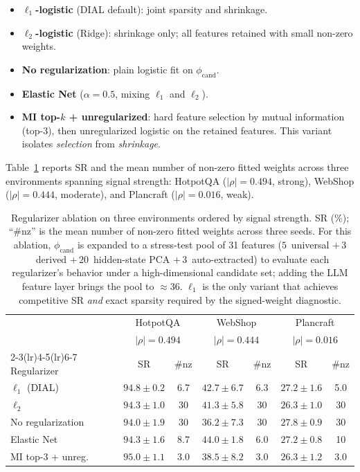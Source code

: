 \begin{itemize}
\item \textbf{$\ell_1$-logistic} (DIAL default): joint sparsity and
shrinkage.
\item \textbf{$\ell_2$-logistic} (Ridge): shrinkage only; all
features retained with small non-zero weights.
\item \textbf{No regularization}: plain logistic fit on
$\phi_{\text{cand}}$.
\item \textbf{Elastic Net} ($\alpha{=}0.5$, mixing $\ell_1$ and
$\ell_2$).
\item \textbf{MI top-$k$ + unregularized}: hard feature selection
by mutual information (top-3), then unregularized logistic on the
retained features. This variant isolates \emph{selection} from
\emph{shrinkage}.
\end{itemize}

Table~\ref{tab:regularizer-ablation} reports SR and the mean number
of non-zero fitted weights across three environments spanning
signal strength: HotpotQA ($|\rho|{=}0.494$, strong),
WebShop ($|\rho|{=}0.444$, moderate), and Plancraft
($|\rho|{=}0.016$, weak).

\begin{table}[h]
\caption{Regularizer ablation on three environments ordered by
signal strength. SR (\%); ``\#nz'' is the mean number of non-zero
fitted weights across three seeds. For this ablation, $\phi_{\text{cand}}$ is expanded to a
stress-test pool of 31 features ($5$~universal $+\,3$~derived
$+\,20$~hidden-state PCA $+\,3$~auto-extracted) to evaluate each
regularizer's behavior under a high-dimensional candidate set;
adding the LLM feature layer brings the pool to $\approx$36.
$\ell_1$ is the only variant that achieves competitive SR
\emph{and} exact sparsity required by the signed-weight
diagnostic.}
\label{tab:regularizer-ablation}
\centering\small
\begin{tabular}{lcccccc}
\toprule
 & \multicolumn{2}{c}{HotpotQA} & \multicolumn{2}{c}{WebShop} & \multicolumn{2}{c}{Plancraft} \\
 & \multicolumn{2}{c}{$|\rho|{=}0.494$} & \multicolumn{2}{c}{$|\rho|{=}0.444$} & \multicolumn{2}{c}{$|\rho|{=}0.016$} \\
\cmidrule(lr){2-3}\cmidrule(lr){4-5}\cmidrule(lr){6-7}
Regularizer & SR & \#nz & SR & \#nz & SR & \#nz \\
\midrule
$\ell_1$ (DIAL)       & $94.8\pm0.2$ & 6.7 & $42.7\pm6.7$ & 6.3 & $27.2\pm1.6$ & 5.0 \\
$\ell_2$              & $94.3\pm1.0$ & 30  & $41.3\pm5.8$ & 30  & $26.3\pm1.0$ & 30  \\
No regularization     & $94.0\pm1.9$ & 30  & $36.2\pm7.3$ & 30  & $27.8\pm0.9$ & 30  \\
Elastic Net           & $94.3\pm1.6$ & 8.7 & $44.0\pm1.8$ & 6.0 & $27.2\pm0.8$ & 10  \\
MI top-3 + unreg.     & $95.0\pm1.1$ & 3.0 & $38.5\pm8.2$ & 3.0 & $26.3\pm1.2$ & 3.0 \\
\bottomrule
\end{tabular}
\end{table}


